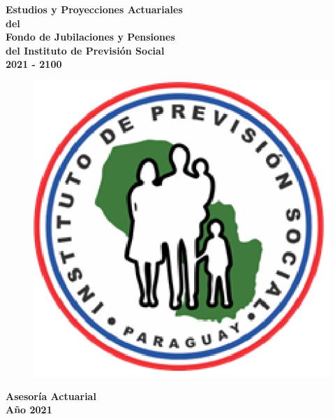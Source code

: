 \documentclass[a4paper,11pt]{article}
\begin{document}
\renewcommand{\listtablename}{\bf{Lista de Tablas}}
\renewcommand{\tablename}{\bf{Tabla}}%
\renewcommand{\figurename}{\bf{Figura}}


\newpage
\thispagestyle{empty}
\begin{center}%
\LARGE\bf {Estudios y Proyecciones Actuariales}\\
\LARGE\bf {del}\\
\LARGE\bf {Fondo de Jubilaciones y Pensiones}\\
\LARGE\bf {del Instituto de Previsión Social}\\
\LARGE\bf {2021 - 2100}\\
\vspace{3cm}


\begin{figure}[h!]
\begin{center}
	\label{fig:logoIPS}
		\includegraphics[scale=1]{logoIPS.eps}
		\end{center}
\end{figure}


\vspace{2cm}
\LARGE\bf {Asesoría Actuarial}\\
\LARGE\bf {Año 2021}\\
\vspace{2cm}
\end{center}
\end{document}
